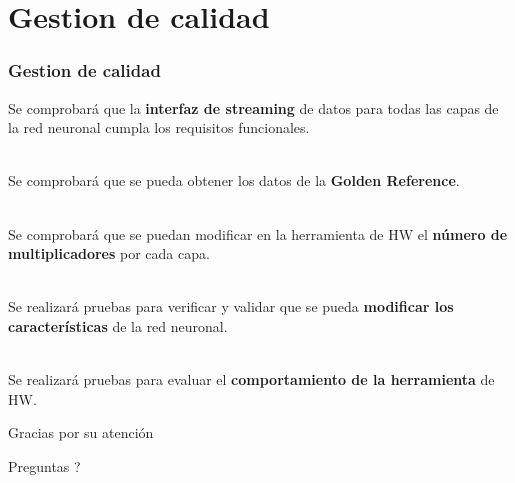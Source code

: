 \documentclass{beamer}
\begin{document}
\section{Gestion de calidad}

\begin{frame}[allowframebreaks,t]

\frametitle{Gestion de calidad}

Se comprobará que la \textbf{interfaz de streaming} de datos para todas las capas de la red neuronal cumpla los requisitos funcionales. \\\

Se comprobará que se pueda obtener los datos de la \textbf{Golden Reference}. \\\

Se comprobará que se puedan modificar en la herramienta de HW el \textbf{número de multiplicadores} por cada capa. \\\

Se realizará pruebas para verificar y validar que se pueda \textbf{modificar los características }de la red neuronal. \\\ 

Se realizará pruebas para evaluar el \textbf{comportamiento de la herramienta} de HW.

\end{frame}


\begin{frame}
\Huge{\centerline{Gracias por su atención}}

\vspace{2cm}

\Huge{\centerline{ Preguntas ? }}

\end{frame}

\end{document}
